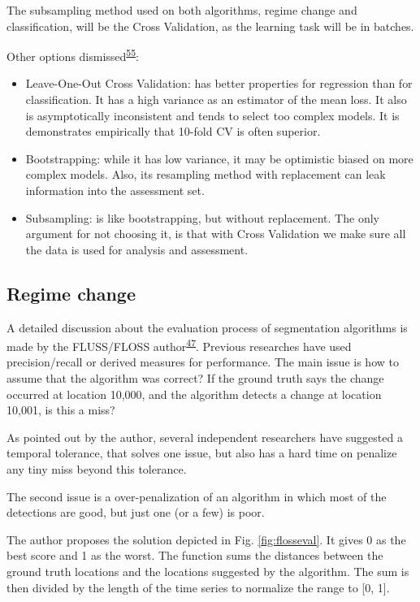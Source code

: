 \documentclass[12pt,twoside]{fmupthesis}
\begin{document}
The subsampling method used on both algorithms, regime change and classification, will be
the Cross Validation, as the learning task will be in batches.

Other options dismissed\textsuperscript{\protect\hyperlink{ref-Bischl2012}{55}}:
\begin{itemize}
\item
  Leave-One-Out Cross Validation: has better properties for regression than for classification. It
  has a high variance as an estimator of the mean loss. It also is asymptotically inconsistent and
  tends to select too complex models. It is demonstrates empirically that 10-fold CV is often
  superior.
\item
  Bootstrapping: while it has low variance, it may be optimistic biased on more complex models.
  Also, its resampling method with replacement can leak information into the assessment set.
\item
  Subsampling: is like bootstrapping, but without replacement. The only argument for not choosing
  it, is that with Cross Validation we make sure all the data is used for analysis and assessment.
\end{itemize}
\hypertarget{regime-change}{%
\subsection{Regime change}\label{regime-change}}

A detailed discussion about the evaluation process of segmentation algorithms is made by the
FLUSS/FLOSS author\textsuperscript{\protect\hyperlink{ref-gharghabi2018}{47}}. Previous researches have used precision/recall or derived
measures for performance. The main issue is how to assume that the algorithm was correct? If the
ground truth says the change occurred at location 10,000, and the algorithm detects a change at
location 10,001, is this a miss?

As pointed out by the author, several independent researchers have suggested a temporal tolerance,
that solves one issue, but also has a hard time on penalize any tiny miss beyond this tolerance.

The second issue is a over-penalization of an algorithm in which most of the detections are
good, but just one (or a few) is poor.

The author proposes the solution depicted in Fig. \ref{fig:flosseval}. It gives 0 as the best score
and 1 as the worst. The function sums the distances between the ground truth locations and the
locations suggested by the algorithm. The sum is then divided by
the length of the time series to normalize the range to {[}0, 1{]}.
\end{document}
